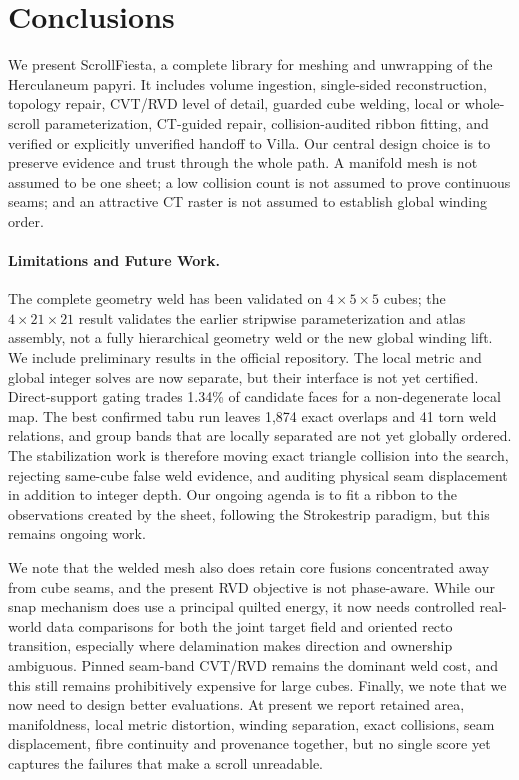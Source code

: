 \section{Conclusions}
We present ScrollFiesta, a complete library for meshing and unwrapping of the Herculaneum papyri. It includes volume ingestion, single-sided reconstruction, topology repair, CVT/RVD level of detail, guarded cube welding, local or whole-scroll parameterization, CT-guided repair, collision-audited ribbon fitting, and verified or explicitly unverified handoff to Villa. Our central design choice is to preserve evidence and trust through the whole path. A manifold mesh is not assumed to be one sheet; a low collision count is not assumed to prove continuous seams; and an attractive CT raster is not assumed to establish global winding order.

\paragraph{Limitations and Future Work.}

The complete geometry weld has been validated on $4\times5\times5$ cubes; the $4\times21\times21$ result validates the earlier stripwise parameterization and atlas assembly, not a fully hierarchical geometry weld or the new global winding lift. We include preliminary results in the official repository. The local metric and global integer solves are now separate, but their interface is not yet certified. Direct-support gating trades 1.34\% of candidate faces for a non-degenerate local map. The best confirmed tabu run leaves 1,874 exact overlaps and 41 torn weld relations, and group bands that are locally separated are not yet globally ordered. The stabilization work is therefore moving exact triangle collision into the search, rejecting same-cube false weld evidence, and auditing physical seam displacement in addition to integer depth. Our ongoing agenda is to fit a ribbon to the observations created by the sheet, following the Strokestrip paradigm, but this remains ongoing work.

We note that the welded mesh also does retain core fusions concentrated away from cube seams, and the present RVD objective is not phase-aware. While our snap mechanism does use a principal quilted energy, it now needs controlled real-world data comparisons for both the joint target field and oriented recto transition, especially where delamination makes direction and ownership ambiguous. Pinned seam-band CVT/RVD remains the dominant weld cost, and this still remains prohibitively expensive for large cubes. Finally, we note that we now need to design better evaluations. At present we report retained area, manifoldness, local metric distortion, winding separation, exact collisions, seam displacement, fibre continuity and provenance together, but no single score yet captures the failures that make a scroll unreadable.

